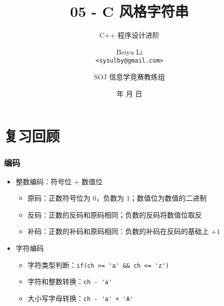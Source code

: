 \title[05 - C 风格字符串]
{05 - C 风格字符串}

\subtitle{C++ 程序设计进阶}

\author[Beiyu Li]
{Beiyu Li\\
\texttt{<sysulby@gmail.com>}}


\date[\today]
{\number\year 年 \number\month 月 \number\day 日}




\author[sysulby]
{SOJ 信息学竞赛教练组}

\begin{frame}
    \titlepage
\end{frame}
\setcounter{framenumber}{0} %

\section{复习回顾}

\begin{frame}[fragile]
    \frametitle{编码}

    \begin{itemize}
        \item<1-> 整数编码：符号位 + 数值位
            \begin{itemize}
                \item 原码：正数符号位为 $0$，负数为 $1$；数值位为数值的二进制
                \item 反码：正数的反码和原码相同；负数的反码将数值位取反
                \item 补码：正数的补码和原码相同：负数的补码在反码的基础上 $+ 1$
            \end{itemize}

        \item<2-> 字符编码
            \begin{itemize}
                \item 字符类型判断：\lstinline|if(ch >= 'a' && ch <= 'z')|
                \item 字符和整数转换：\lstinline|ch - 'a'|
                \item 大小写字母转换：\lstinline|ch - 'a' + 'A'|
            \end{itemize}
    \end{itemize}

\end{frame}

